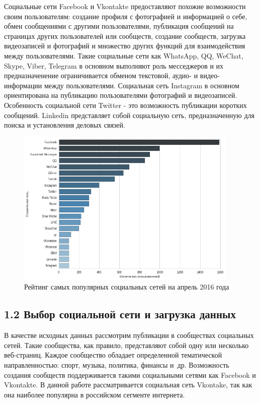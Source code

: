 \documentclass[a4paper]{report}
\begin{document}
	Социальные сети Facebook и Vkontakte предоставляют похожие возможности своим пользователям: создание профиля с фотографией и информацией о себе, обмен сообщениями с другими пользователями, публикация сообщений на страницах других пользователей или сообществ, создание сообществ, загрузка видеозаписей и фотографий и множество других функций для взаимодействия между пользователями. Такие социальные сети как WhatsApp, QQ, WeChat, Skype, Viber, Telegram в основном выполняют роль месседжеров и их предназначенение ограничивается обменом текстовой, аудио- и видео- информации между пользователями. Социальная сеть Instagram в основном ориентирована на публикацию пользователями фотографий и видеозаписей.
	Особенность социальной сети Twitter - это возможность публикации коротких сообщений. Linkedin представляет собой социальную сеть, предназначенную для поиска и установления деловых связей.
	
	
	
	
	


	
	\begin{figure}
		\centering
		\includegraphics[width=400px]
		{imgs/NetworkStatistics.png}
		\caption{Рейтинг самых популярных  социальных сетей на апрель 2016 года}
		\label{fig:stat}
	\end{figure}
	
	
	
	
	
	\subsection{1.2 Выбор социальной сети и загрузка данных}
	
	В качестве исходных данных рассмотрим публикации в сообществах социальных сетей. 
	Такие сообщества, как правило, представляют собой одну или несколько веб-страниц. 
	Каждое сообщество обладает определенной тематической направленностью: спорт, музыка, политика, финансы и~др.
	Возможность создания сообществ поддерживается такими социальными сетями как Facebook и Vkontakte. 
	В данной работе рассматривается социальная сеть Vkontake, так как она наиболее популярна в российском сегменте интернета.
			
\end{document}
